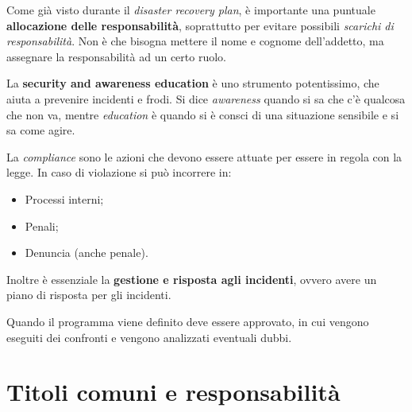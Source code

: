 Come già visto durante il \textit{disaster recovery plan}, è importante una
puntuale \textbf{allocazione delle responsabilità}, soprattutto per evitare
possibili \emph{scarichi di responsabilità}. Non è che bisogna mettere il nome
e cognome dell'addetto, ma assegnare la responsabilità ad un certo ruolo.

La \textbf{security and awareness education} è uno strumento potentissimo, che
aiuta a prevenire incidenti e frodi. Si dice \textit{awareness} quando si sa
che c'è qualcosa che non va, mentre \textit{education} è quando si è consci di
una situazione sensibile e si sa come agire.

La \textit{compliance} sono le azioni che devono essere attuate per
essere in regola con la legge. In caso di violazione si può incorrere in:
\begin{itemize}
  \item Processi interni;
  \item Penali;
  \item Denuncia (anche penale).
\end{itemize}
Inoltre è essenziale la \textbf{gestione e risposta agli incidenti},
ovvero avere un piano di risposta per gli incidenti.

Quando il programma viene definito deve essere approvato, in cui vengono
eseguiti dei confronti e vengono analizzati eventuali dubbi.

\section{Titoli comuni e responsabilità}

